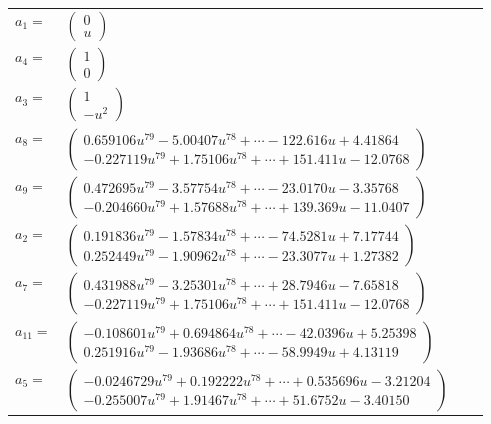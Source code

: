 \documentclass[1p]{elsarticle_modified}
\theoremstyle{definition}
\begin{document}
\begin{tabular}{m{7pt} m{180pt} m{7pt} m{180pt} }
\flushright $a_{1}=$&$\begin{pmatrix}0\\u\end{pmatrix}$ \\
\flushright $a_{4}=$&$\begin{pmatrix}1\\0\end{pmatrix}$ \\
\flushright $a_{3}=$&$\begin{pmatrix}1\\- u^2\end{pmatrix}$ \\
\flushright $a_{8}=$&$\begin{pmatrix}0.659106 u^{79}-5.00407 u^{78}+\cdots-122.616 u+4.41864\\-0.227119 u^{79}+1.75106 u^{78}+\cdots+151.411 u-12.0768\end{pmatrix}$ \\
\flushright $a_{9}=$&$\begin{pmatrix}0.472695 u^{79}-3.57754 u^{78}+\cdots-23.0170 u-3.35768\\-0.204660 u^{79}+1.57688 u^{78}+\cdots+139.369 u-11.0407\end{pmatrix}$ \\
\flushright $a_{2}=$&$\begin{pmatrix}0.191836 u^{79}-1.57834 u^{78}+\cdots-74.5281 u+7.17744\\0.252449 u^{79}-1.90962 u^{78}+\cdots-23.3077 u+1.27382\end{pmatrix}$ \\
\flushright $a_{7}=$&$\begin{pmatrix}0.431988 u^{79}-3.25301 u^{78}+\cdots+28.7946 u-7.65818\\-0.227119 u^{79}+1.75106 u^{78}+\cdots+151.411 u-12.0768\end{pmatrix}$ \\
\flushright $a_{11}=$&$\begin{pmatrix}-0.108601 u^{79}+0.694864 u^{78}+\cdots-42.0396 u+5.25398\\0.251916 u^{79}-1.93686 u^{78}+\cdots-58.9949 u+4.13119\end{pmatrix}$ \\
\flushright $a_{5}=$&$\begin{pmatrix}-0.0246729 u^{79}+0.192222 u^{78}+\cdots+0.535696 u-3.21204\\-0.255007 u^{79}+1.91467 u^{78}+\cdots+51.6752 u-3.40150\end{pmatrix}$ \\

\end{tabular}
\end{document}
